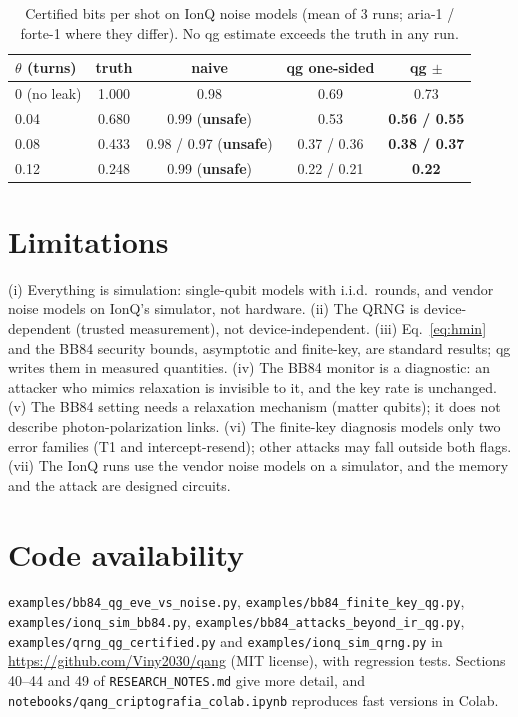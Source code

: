 \documentclass[11pt]{article}
\begin{document}
\begin{table}[t]
\centering\small
\caption{Certified bits per shot on IonQ noise models (mean of 3 runs; aria-1 / forte-1 where they
differ). No qg estimate exceeds the truth in any run.}
\label{tab:qrngionq}
\begin{tabular}{lcccc}
\toprule
$\theta$ (turns) & truth & naive & qg one-sided & qg $\pm$\\
\midrule
0 (no leak) & 1.000 & 0.98 & 0.69 & 0.73\\
0.04 & 0.680 & 0.99 (\textbf{unsafe}) & 0.53 & \textbf{0.56 / 0.55}\\
0.08 & 0.433 & 0.98 / 0.97 (\textbf{unsafe}) & 0.37 / 0.36 & \textbf{0.38 / 0.37}\\
0.12 & 0.248 & 0.99 (\textbf{unsafe}) & 0.22 / 0.21 & \textbf{0.22}\\
\bottomrule
\end{tabular}
\end{table}

\section{Limitations}

(i) Everything is simulation: single-qubit models with i.i.d.\ rounds, and vendor noise models on IonQ's simulator, not hardware. (ii) The QRNG is
device-dependent (trusted measurement), not device-independent. (iii) Eq.~\eqref{eq:hmin} and the
BB84 security bounds, asymptotic and finite-key, are standard results; qg writes them in measured quantities. (iv) The BB84
monitor is a diagnostic: an attacker who mimics relaxation is invisible to it, and the key rate is
unchanged. (v) The BB84 setting needs a relaxation mechanism (matter qubits); it does not describe
photon-polarization links. (vi) The finite-key diagnosis models only two error families (T1 and
intercept-resend); other attacks may fall outside both flags. (vii) The IonQ runs use the vendor noise models on a simulator, and the memory and the
attack are designed circuits.

\section{Code availability}
\sloppy
\texttt{examples/bb84\_qg\_eve\_vs\_noise.py}, \texttt{examples/bb84\_finite\_key\_qg.py}, \texttt{examples/ionq\_sim\_bb84.py}, \texttt{examples/bb84\_attacks\_beyond\_ir\_qg.py}, \texttt{examples/qrng\_qg\_certified.py} and \texttt{examples/ionq\_sim\_qrng.py} in
\url{https://github.com/Viny2030/qang} (MIT license), with regression tests. Sections 40--44 and 49 of
\texttt{RESEARCH\_NOTES.md} give more detail, and \texttt{notebooks/qang\_criptografia\_colab.ipynb}
reproduces fast versions in Colab.



\end{document}
